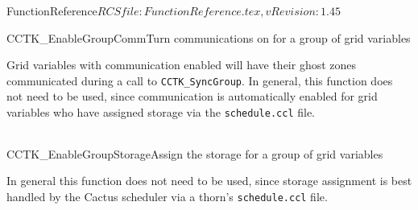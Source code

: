 \begin{cactuspart}{5}{FunctionReference}{$RCSfile: FunctionReference.tex,v $}{$Revision: 1.45 $}
\begin{CCTKFunc}{CCTK\_EnableGroupComm}{Turn communications on for a group of grid variables}
\label{CCTK-EnableGroupComm}
\showcargs
\begin{params}
\end{params}
\begin{discussion}
Grid variables with communication enabled will have their ghost zones communicated during a call
to {\tt CCTK\_SyncGroup}. In general, this function does not need to be used, since communication
is automatically enabled for grid variables who have assigned storage via the {\tt schedule.ccl}
file.
\end{discussion}
\begin{examples}
\begin{tabular}{@{}p{3cm}cp{11cm}}
\end{tabular}
\end{examples}
\begin{errorcodes}
\end{errorcodes}
\end{CCTKFunc}



\begin{CCTKFunc}{CCTK\_EnableGroupStorage}{Assign the storage for a group of grid variables}
\label{CCTK-EnableGroupStorage}
\showcargs
\begin{params}
\end{params}
\begin{discussion}
In general this function does not need to be used, since storage assignment is best handled by
the Cactus scheduler via a thorn's {\tt schedule.ccl} file.
\end{discussion}
\begin{examples}
\begin{tabular}{@{}p{3cm}cp{11cm}}
\end{tabular}
\end{examples}
\begin{errorcodes}
\end{errorcodes}
\end{CCTKFunc}



\end{cactuspart}
